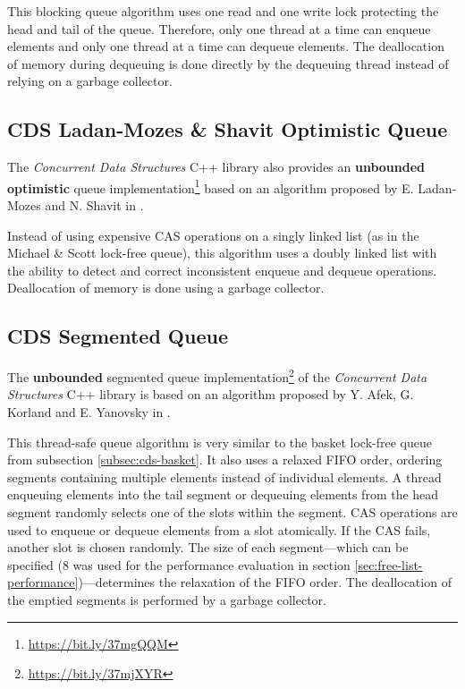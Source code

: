 	This blocking queue algorithm uses one read and one write lock protecting the head and tail of the queue. Therefore, only one thread at a time can enqueue elements and only one thread at a time can dequeue elements. The deallocation of memory during dequeuing is done directly by the dequeuing thread instead of relying on a garbage collector.

\subsection[CDS OptimisticQueue]{CDS Ladan-Mozes \& Shavit Optimistic Queue} \label{subsec:cds-optimistic}

	The \textit{Concurrent Data Structures} C++ library also provides an \textbf{unbounded} \textbf{optimistic} queue implementation\footnote{\url{https://bit.ly/37mgQQM}} based on an algorithm proposed by E. Ladan-Mozes and N. Shavit in \cite{Ladan-Mozes:2004}.
	
	Instead of using expensive CAS operations on a singly linked list (as in the Michael \& Scott lock-free queue), this algorithm uses a doubly linked list with the ability to detect and correct inconsistent enqueue and dequeue operations. Deallocation of memory is done using a garbage collector.

\subsection[CDS SegmentedQueue]{CDS Segmented Queue} \label{subsec:cds-segmented}

	The \textbf{unbounded} segmented queue implementation\footnote{\url{https://bit.ly/37mjXYR}} of the \textit{Concurrent Data Structures} C++ library is based on an algorithm proposed by Y. Afek, G. Korland and E. Yanovsky in \cite{Afek:2010}.
	
	This thread-safe queue algorithm is very similar to the basket lock-free queue from subsection \ref{subsec:cds-basket}. It also uses a relaxed FIFO order, ordering segments containing multiple elements instead of individual elements. A thread enqueuing elements into the tail segment or dequeuing elements from the head segment randomly selects one of the slots within the segment. CAS operations are used to enqueue or dequeue elements from a slot atomically. If the CAS fails, another slot is chosen randomly. The size of each segment---which can be specified (\num{8} was used for the performance evaluation in section \ref{sec:free-list-performance})---determines the relaxation of the FIFO order. The deallocation of the emptied segments is performed by a garbage collector.

